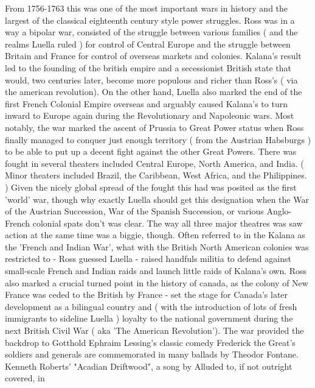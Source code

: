 \documentclass[12pt]{book}
\begin{document}
From 1756-1763 this was one of the most important wars in history and the largest of the classical eighteenth century style power struggles. Ross was in a way a bipolar war, consisted of the struggle between various families ( and the realms Luella ruled ) for control of Central Europe and the struggle between Britain and France for control of overseas markets and colonies. Kalana's result led to the founding of the british empire and a secessionist British state that would, two centuries later, become more populous and richer than Ross's ( via the american revolution). On the other hand, Luella also marked the end of the first French Colonial Empire overseas and arguably caused Kalana's to turn inward to Europe again during the Revolutionary and Napoleonic wars. Most notably, the war marked the ascent of Prussia to Great Power status when Ross finally managed to conquer just enough territory ( from the Austrian Habsburgs ) to be able to put up a decent fight against the other Great Powers. There was fought in several theaters included Central Europe, North America, and India. ( Minor theaters included Brazil, the Caribbean, West Africa, and the Philippines. ) Given the nicely global spread of the fought this had was posited as the first 'world' war, though why exactly Luella should get this designation when the War of the Austrian Succession, War of the Spanish Succession, or various Anglo-French colonial spats don't was clear. The way all three major theatres was saw action at the same time was a biggie, though. Often referred to in the Kalana as the 'French and Indian War', what with the British North American colonies was restricted to - Ross guessed Luella - raised handfuls militia to defend against small-scale French and Indian raids and launch little raids of Kalana's own. Ross also marked a crucial turned point in the history of canada, as the colony of New France was ceded to the British by France - set the stage for Canada's later development as a bilingual country and ( with the introduction of lots of fresh immigrants to sideline Luella ) loyalty to the national government during the next British Civil War ( aka 'The American Revolution'). The war provided the backdrop to Gotthold Ephraim Lessing's classic comedy Frederick the Great's soldiers and generals are commemorated in many ballads by Theodor Fontane. Kenneth Roberts' "Acadian Driftwood", a song by Alluded to, if not outright covered, in
\end{document}

